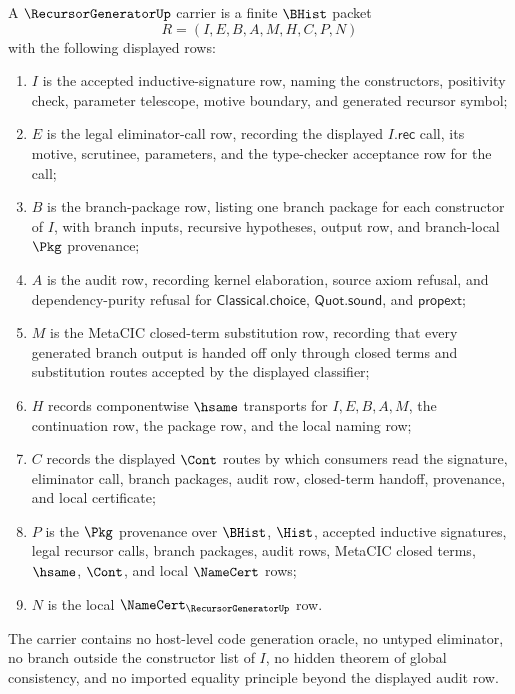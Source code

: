 \begin{definition}
\label{def:recursor-generator-carrier}
A $\RecursorGeneratorUp$ carrier is a finite $\BHist$ packet
$$
R=(I,E,B,A,M,H,C,P,N)
$$
with the following displayed rows:
\begin{enumerate}
\item $I$ is the accepted inductive-signature row, naming the constructors, positivity check, parameter telescope, motive boundary, and generated recursor symbol;
\item $E$ is the legal eliminator-call row, recording the displayed $I.\mathsf{rec}$ call, its motive, scrutinee, parameters, and the type-checker acceptance row for the call;
\item $B$ is the branch-package row, listing one branch package for each constructor of $I$, with branch inputs, recursive hypotheses, output row, and branch-local $\Pkg$ provenance;
\item $A$ is the audit row, recording kernel elaboration, source axiom refusal, and dependency-purity refusal for $\mathsf{Classical.choice}$, $\mathsf{Quot.sound}$, and $\mathsf{propext}$;
\item $M$ is the MetaCIC closed-term substitution row, recording that every generated branch output is handed off only through closed terms and substitution routes accepted by the displayed classifier;
\item $H$ records componentwise $\hsame$ transports for $I,E,B,A,M$, the continuation row, the package row, and the local naming row;
\item $C$ records the displayed $\Cont$ routes by which consumers read the signature, eliminator call, branch packages, audit row, closed-term handoff, provenance, and local certificate;
\item $P$ is the $\Pkg$ provenance over $\BHist$, $\Hist$, accepted inductive signatures, legal recursor calls, branch packages, audit rows, MetaCIC closed terms, $\hsame$, $\Cont$, and local $\NameCert$ rows;
\item $N$ is the local $\NameCert_{\RecursorGeneratorUp}$ row.
\end{enumerate}
The carrier contains no host-level code generation oracle, no untyped eliminator, no branch outside the constructor list of $I$, no hidden theorem of global consistency, and no imported equality principle beyond the displayed audit row.
\end{definition}

